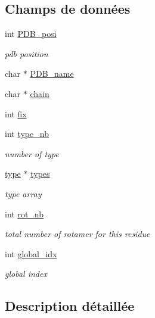\subsection*{Champs de données}
\begin{DoxyCompactItemize}
\item 
int \hyperlink{structresidue_afa720c250e605c3ae15eaca9a424eca1}{P\+D\+B\+\_\+posi}
\begin{DoxyCompactList}\small\item\em pdb position \end{DoxyCompactList}\item 
char $\ast$ \hyperlink{structresidue_a25af0aae0cd213a39bb9dedffcd25772}{P\+D\+B\+\_\+name}
\item 
char $\ast$ \hyperlink{structresidue_a817552a29072eb9ac772ec8b58e8bb49}{chain}
\item 
int \hyperlink{structresidue_a55a85fafae4a3379d93f4ab037ffe5c1}{fix}
\item 
int \hyperlink{structresidue_abb7672d7abb08b7ad044fccd7964fcca}{type\+\_\+nb}
\begin{DoxyCompactList}\small\item\em number of type \end{DoxyCompactList}\item 
\hyperlink{structtype}{type} $\ast$ \hyperlink{structresidue_af53f6e2a6a5994935bada9ce0bcdbc82}{types}
\begin{DoxyCompactList}\small\item\em type array \end{DoxyCompactList}\item 
int \hyperlink{structresidue_add24ab42da2ac2437a1f177267ae1866}{rot\+\_\+nb}
\begin{DoxyCompactList}\small\item\em total number of rotamer for this residue \end{DoxyCompactList}\item 
int \hyperlink{structresidue_abf17ad732336d6b3254c99a6995b6402}{global\+\_\+idx}
\begin{DoxyCompactList}\small\item\em global index \end{DoxyCompactList}\end{DoxyCompactItemize}


\subsection{Description détaillée}


